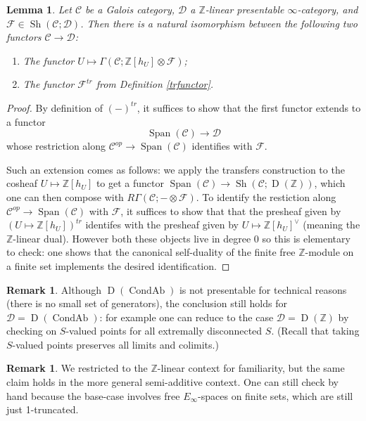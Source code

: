 \documentclass[12pt]{article}
\newtheorem{lemma}[theorem]{Lemma}
\theoremstyle{definition}
\newtheorem{remark}[theorem]{Remark}
\newcommand{\on}{\operatorname}
\newcommand{\mc}{\mathcal}
\newcommand{\mbb}{\mathbb}
\begin{document}
\begin{lemma}\label{alttr}
Let $\mc{C}$ be a Galois category, $\mc{D}$ a $\mbb{Z}$-linear presentable $\infty$-category, and $\mc{F}\in\on{Sh}(\mc{C};\mc{D})$.  Then there is a natural isomorphism between the following two functors $\mc{C}\to\mc{D}$:
\begin{enumerate}
\item The functor $U\mapsto \Gamma(\mc{C};\mbb{Z}[h_U]\otimes\mc{F})$;
\item The functor $\mc{F}^{tr}$ from Definition \ref{trfunctor}.
\end{enumerate}
\end{lemma}
\begin{proof}
By definition of $(-)^{tr}$, it suffices to show that the first functor extends to a functor
$$\on{Span}(\mc{C})\to\mc{D}$$
whose restriction along $\mc{C}^{op} \to \on{Span}(\mc{C})$ identifies with $\mc{F}$.

Such an extension comes as follows: we apply the transfers construction to the cosheaf $U\mapsto \mbb{Z}[h_U]$ to get a functor $\on{Span}(\mc{C}) \to \on{Sh}(\mc{C};\on{D}(\mbb{Z}))$, which one can then compose with $R\Gamma(\mc{C};-\otimes\mc{F})$.  To identify the restiction along $\mc{C}^{op} \to \on{Span}(\mc{C})$ with $\mc{F}$, it suffices to show that that the presheaf given by $(U\mapsto \mbb{Z}[h_U])^{tr}$ identifes with the presheaf given by $U\mapsto \mbb{Z}[h_U]^\vee$ (meaning the $\mbb{Z}$-linear dual).  However both these objects live in degree $0$ so this is elementary to check: one shows that the canonical self-duality of the finite free $\mbb{Z}$-module on a finite set implements the desired identification.
\end{proof}

\begin{remark}
Although $\on{D}(\on{CondAb})$ is not presentable for technical reasons (there is no small set of generators), the conclusion still holds for $\mc{D}=\on{D}(\on{CondAb})$: for example one can reduce to the case $\mc{D}=\on{D}(\mbb{Z})$ by checking on $S$-valued points for all extremally disconnected $S$.  (Recall that taking $S$-valued points preserves all limits and colimits.)
\end{remark}

\begin{remark}
We restricted to the $\mbb{Z}$-linear context for familiarity, but the same claim holds in the more general semi-additive context.  One can still check by hand because the base-case involves free $E_\infty$-spaces on finite sets, which are still just 1-truncated.
\end{remark}
\end{document}

